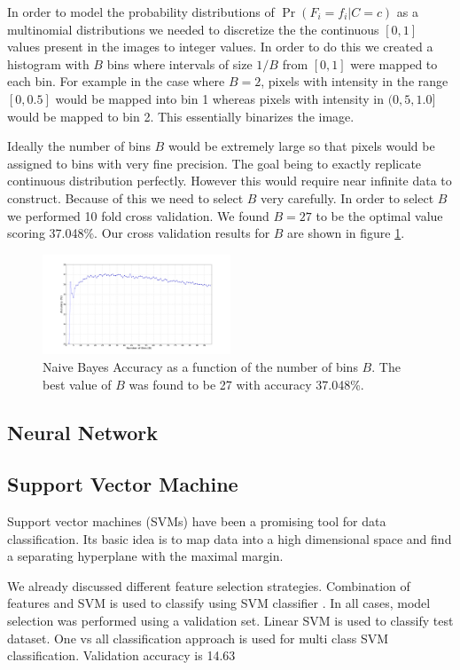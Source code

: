 \documentclass[10pt,twocolumn]{article}
\begin{document}
In order to model the probability distributions of $\Pr(F_i = f_i | C = c)$ as a multinomial distributions we needed to discretize the the continuous $[0,1]$ values present in the images to integer values. In order to do this we created a histogram with $B$ bins where intervals of size $1/B$ from $[0,1]$ were mapped to each bin. For example in the case where $B = 2$, pixels with intensity in the range $[0,0.5]$ would be mapped into bin 1 whereas pixels with intensity in $(0,5,1.0]$ would be mapped to bin 2. This essentially binarizes the image.

Ideally the number of bins $B$ would be extremely large so that pixels would be assigned to bins with very fine precision. The goal being to exactly replicate continuous distribution perfectly. However this would require near infinite data to construct. Because of this we need to select $B$ very carefully. In order to select $B$ we performed 10 fold cross validation. We found $B=27$ to be the optimal value scoring 37.048\%. Our cross validation results for $B$ are shown in figure \ref{bins}.
\begin{figure}
\includegraphics[trim=150 40 150 50,clip=true,width=0.5\textwidth]{./figure_1.png}
\caption{Naive Bayes Accuracy as a function of the number of bins $B$. The best value of $B$ was found to be 27 with accuracy 37.048\%.}
\label{bins}
\end{figure}
\subsection{Neural Network}
\subsection{Support Vector Machine}
Support vector machines (SVMs) have been a promising tool for data classification. Its basic idea is to map data into a high dimensional space and find a separating hyperplane with the maximal margin.

We already discussed different feature selection strategies. Combination of features and SVM is used to classify using SVM classifier \cite {chen2006combining}. In all cases, model selection was performed using a validation set. Linear SVM is used to classify test dataset. One vs all classification approach is used for multi class SVM classification. Validation accuracy is 14.63%
\end{document}
